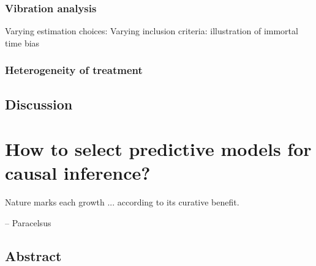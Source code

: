 \documentclass{report}
\begin{document}
\subsection{Vibration analysis}\label{subsection:causal_tuto:vibration_mimic}
Varying estimation choices:
Varying inclusion criteria: illustration of immortal time bias

\subsection{Heterogeneity of treatment}\label{subsec:causal_tuto:heterogeneity_mimic}

\section{Discussion}\label{subsec:causal_tuto:discussion}

\chapter{How to select predictive models for causal inference?}\label{chapter:causal_model_selection}

\begin{citationbox}
  Nature marks each growth ... according to its curative benefit.
  \par\hfill -- Paracelsus
\end{citationbox}


\section*{Abstract}\label{sec:causal_model_selection:abstract}
\end{document}
